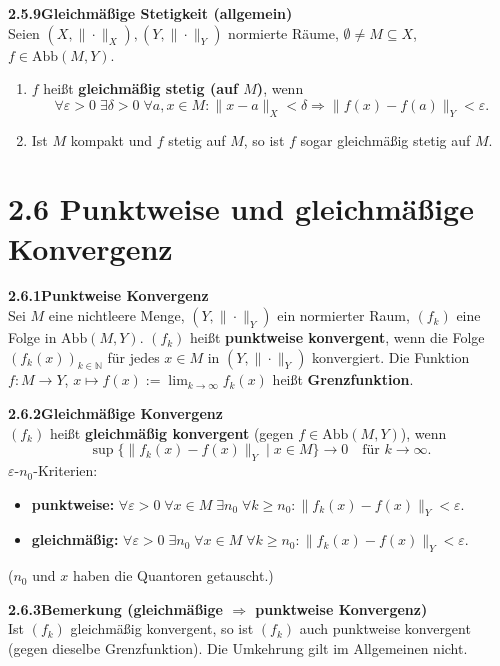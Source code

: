 \documentclass[a4paper,12pt]{article}
\newcommand{\gentry}[3]{%
  \noindent\textbf{#1\quad #2}\nopagebreak\\[0.2em]
  #3\par\smallskip
}
\begin{document}
\gentry{2.5.9}{Gleichmäßige Stetigkeit (allgemein)}{%
  Seien $(X, \|\cdot\|_X), (Y, \|\cdot\|_Y)$ normierte Räume,
  $\emptyset \neq M \subseteq X$, $f \in \mathrm{Abb}(M, Y)$.
  \begin{enumerate}[label=(\roman*),topsep=2pt,itemsep=1pt]
    \item $f$ heißt \textbf{gleichmäßig stetig (auf $M$)}, wenn
    \[
      \forall \varepsilon > 0\;\exists \delta > 0\;\forall a, x \in M:
      \|x - a\|_X < \delta \Rightarrow \|f(x) - f(a)\|_Y < \varepsilon.
    \]
    \item Ist $M$ kompakt und $f$ stetig auf $M$, so ist $f$ sogar gleichmäßig
    stetig auf $M$.
  \end{enumerate}
}

\section*{2.6 \quad Punktweise und gleichmäßige Konvergenz}

\gentry{2.6.1}{Punktweise Konvergenz}{%
  Sei $M$ eine nichtleere Menge, $(Y, \|\cdot\|_Y)$ ein normierter Raum, $(f_k)$
  eine Folge in $\mathrm{Abb}(M, Y)$. $(f_k)$ heißt \textbf{punktweise konvergent},
  wenn die Folge $(f_k(x))_{k \in \mathbb{N}}$ für jedes $x \in M$ in
  $(Y, \|\cdot\|_Y)$ konvergiert. Die Funktion
  $f: M \to Y$, $x \mapsto f(x) := \lim_{k \to \infty} f_k(x)$ heißt
  \textbf{Grenzfunktion}.
}

\gentry{2.6.2}{Gleichmäßige Konvergenz}{%
  $(f_k)$ heißt \textbf{gleichmäßig konvergent} (gegen $f \in \mathrm{Abb}(M, Y)$), wenn
  \[
    \sup\{\|f_k(x) - f(x)\|_Y \mid x \in M\} \to 0 \quad \text{für } k \to \infty.
  \]
  $\varepsilon$-$n_0$-Kriterien:
  \begin{itemize}[topsep=2pt,itemsep=1pt]
    \item \textbf{punktweise:} $\forall \varepsilon > 0\;\forall x \in M\;\exists n_0\;\forall k \geq n_0: \|f_k(x) - f(x)\|_Y < \varepsilon$.
    \item \textbf{gleichmäßig:} $\forall \varepsilon > 0\;\exists n_0\;\forall x \in M\;\forall k \geq n_0: \|f_k(x) - f(x)\|_Y < \varepsilon$.
  \end{itemize}
  ($n_0$ und $x$ haben die Quantoren getauscht.)
}

\gentry{2.6.3}{Bemerkung (gleichmäßige $\Rightarrow$ punktweise Konvergenz)}{%
  Ist $(f_k)$ gleichmäßig konvergent, so ist $(f_k)$ auch punktweise konvergent
  (gegen dieselbe Grenzfunktion). Die Umkehrung gilt im Allgemeinen nicht.
}
\end{document}
